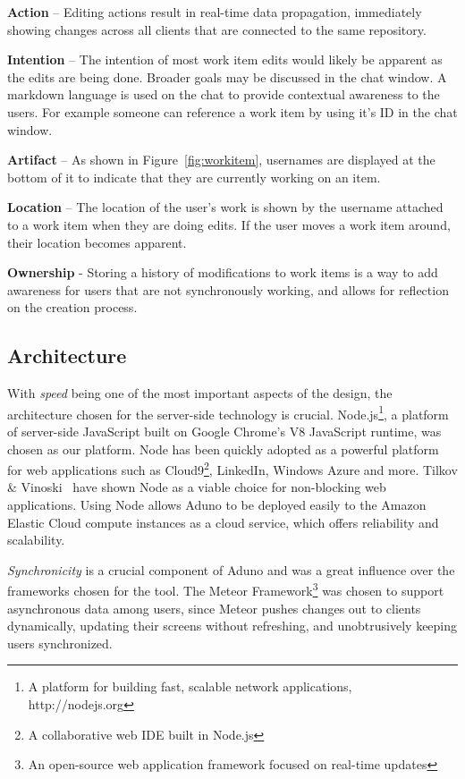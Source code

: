 \documentclass[conference]{IEEEtran}
\begin{document}
{\bf Action} – Editing actions result in real-time data propagation, immediately showing changes across all clients that are connected to the same repository.  

{\bf Intention} – The intention of most work item edits would likely be apparent as the edits are being done. Broader goals may be discussed in the chat window. A markdown language is used on the chat to provide contextual awareness to the users.  For example someone can reference a work item by using it's ID in the chat window.
 
{\bf Artifact} – As shown in Figure~\ref{fig:workitem}, usernames are displayed at the bottom of it to indicate that they are currently working on an item.

{\bf Location} – The location of the user’s work is shown by the username attached to a work item when they are doing edits. If the user moves a work item around, their location becomes apparent.

{\bf Ownership} - Storing a history of modifications to work items is a way to add awareness for users that are not synchronously working, and allows for reflection on the creation process.

\subsection{Architecture}
With \emph{speed} being one of the most important aspects of the design, the architecture chosen for the server-side technology is crucial.  Node.js\footnote{A platform for building fast, scalable network applications, http://nodejs.org}, a platform of server-side JavaScript built on Google Chrome's V8 JavaScript runtime, was chosen as our platform.  Node has been quickly adopted as a powerful platform for web applications such as Cloud9\footnote{A collaborative web IDE built in Node.js}, LinkedIn, Windows Azure and more.  Tilkov \& Vinoski~\cite{TV10} have shown Node as a viable choice for non-blocking web applications.  Using Node allows Aduno to be deployed easily to the Amazon Elastic Cloud compute instances as a cloud service, which offers reliability and scalability.

\emph{Synchronicity} is a crucial component of Aduno and was a great influence over the frameworks chosen for the tool.  The Meteor Framework\footnote{An open-source web application framework focused on real-time updates} was chosen to support asynchronous data among users, since Meteor pushes changes out to clients dynamically, updating their screens without refreshing, and unobtrusively keeping users synchronized.  
\end{document}
